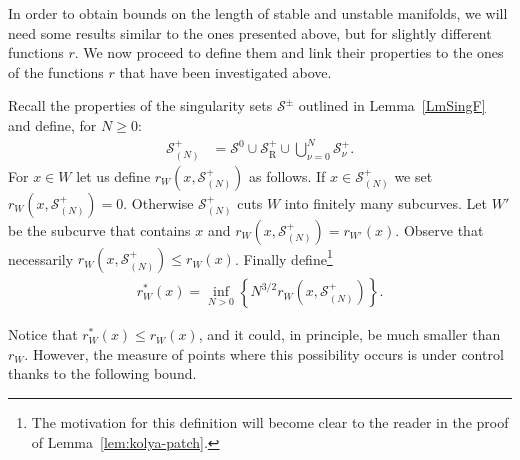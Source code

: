 \documentclass[AHL, Unicode, longabstracts,published]{cedram}
\newcommand{\recoPrivate}{\mathrm{R}}
\newcommand{\singPrivate}{\mathcal{S}}
\newcommand{\sing}[1]{\singPrivate^{#1}}
\newcommand{\singBoth}{\singPrivate^\pm}
\newcommand{\singForward}[1]{\singPrivate^+_{#1}}
\newcommand{\indCell}{\nu}
\begin{document}
In order to obtain bounds on the length of stable and unstable manifolds, we will need some results similar to the ones presented above, but for slightly different functions $r$. We now proceed to define them and link their properties to the ones of the functions $r$ that have been investigated above.

Recall the properties of the singularity sets $\singBoth$ outlined in Lemma~\ref{LmSingF} and define, for $N \ge 0$:
\begin{align*}
\singForward{(N)} &= \sing{0}\cup\singForward\recoPrivate\cup\bigcup_{\indCell = 0}^{N}\singForward{\indCell}.
\end{align*}
For $x\in W$ let us define $r_W(x,\singForward{(N)})$ as follows. If $x\in\singForward{(N)}$ we set $r_W(x,\singForward{(N)}) = 0$. Otherwise $\singForward{(N)}$ cuts $W$ into finitely many subcurves. Let $W'$ be the subcurve that contains $x$ and $r_W(x,\singForward{(N)}) = r_{W'}(x)$. Observe that necessarily $r_{W}(x,\singForward{(N)})\le r_{W}(x)$. Finally define\footnote{ The motivation for this definition will become clear to the reader in the proof of Lemma~\ref{lem:kolya-patch}.}
\begin{align*}
r_{W}^{*}(x) = \inf_{N > 0}\left\{N^{3/2}r_{W}\left(x,\singForward{(N)}\right)\right\}.
\end{align*}

Notice that $r^{*}_{W}(x)\le r_{W}(x)$, and it could, in principle, be much smaller than $r_{W}$. However, the measure of points where this possibility occurs is under control thanks to the following bound.
\end{document}
